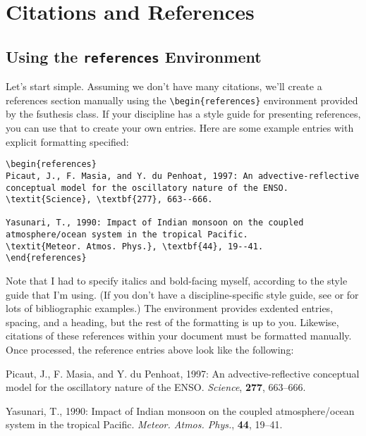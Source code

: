 \def\BiBTeX{{\rmfamily B\kern-.05em%
   \textsc{i\kern-.025em b}\kern-.08em\TeX}}

\newenvironment{narrowref}{\par
  \frenchspacing
  \setlength{\leftskip}{4.5em}
  \setlength{\rightskip}{3em}
  \setlength{\parindent}{-1.5em}
  \setlength{\parskip}{.6\baselineskip}}%
 {\par\nonfrenchspacing\addvspace{.5\baselineskip}}

\chapter{Citations and References}
\section{Using the \texttt{references} Environment}
Let's start simple.  Assuming we don't have many citations, we'll
create a references section manually using the
\verb|\begin{references}| environment provided by the
\textsf{fsuthesis} class.  If your discipline has a style
guide for presenting references, you can use that to create your own
entries.  Here are some example entries with explicit formatting
specified:
\begin{verbatim}
\begin{references}
Picaut, J., F. Masia, and Y. du Penhoat, 1997: An advective-reflective
conceptual model for the oscillatory nature of the ENSO.
\textit{Science}, \textbf{277}, 663--666.

Yasunari, T., 1990: Impact of Indian monsoon on the coupled
atmosphere/ocean system in the tropical Pacific.
\textit{Meteor. Atmos. Phys.}, \textbf{44}, 19--41.
\end{references}
\end{verbatim}

Note that I had to specify italics and bold-facing myself, according
to the style guide that I'm using.  (If you don't have a
discipline-specific style guide, see \cite{Anonymous:1993:CMS}
or \cite{Anonymous:2009:PMA} for lots of bibliographic examples.)
The  environment provides exdented entries, spacing,
and a heading, but the rest of the formatting is up to you.  Likewise,
citations of these references within your document must be formatted
manually.  Once processed, the reference entries above look like the
following:
\begin{narrowref}
Picaut, J., F. Masia, and Y. du Penhoat, 1997: An advective-reflective
conceptual model for the oscillatory nature of the ENSO.
\textit{Science}, \textbf{277}, 663--666.

Yasunari, T., 1990: Impact of Indian monsoon on the coupled
atmosphere/ocean system in the tropical Pacific.
\textit{Meteor. Atmos. Phys.}, \textbf{44}, 19--41.
\end{narrowref}

